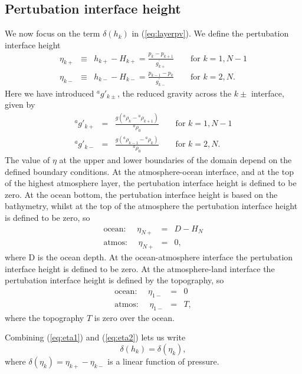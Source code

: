\documentclass[11pt, a4paper,twoside]{article}
\newcommand{\rhb}[1]{{{}^{#1}\rho}}
\newcommand{\gp}[2]{{}^{#1}g'_{#2}}
\numberwithin{equation}{section}
\begin{document}
\subsection{Pertubation interface height}
We now focus on the term $\delta(h_k)$ in (\ref{eq:layerpv}). We define the pertubation interface height
\begin{eqnarray}
\eta_{k+} & \equiv & h_{k+} - H_{k+} = \frac{p_k - p_{k+1}}{g^\prime_{k+}} \quad \quad \textrm{for } k=1,N-1\label{eq:eta1}\\
\eta_{k-} & \equiv & h_{k-} - H_{k-} = \frac{p_{k-1} - p_{k}}{g^\prime_{k-}}  \quad \quad \textrm{for } k=2,N.\label{eq:eta2}
\end{eqnarray}
Here we have introduced $\gp{a}{k\pm}$, the reduced gravity across the $k\pm$ interface, given by
\begin{eqnarray}
\gp{a}{k+} & = & \frac{g(\rhb{a}_k - \rhb{a}_{k+1})}{\rhb{a}_0} \quad \quad \textrm{for } k=1,N-1\\
\gp{a}{k-} & = & \frac{g(\rhb{a}_{k-1} - \rhb{a}_{k})}{\rhb{a}_0} \quad \quad \textrm{for } k=2,N.
\end{eqnarray}
The value of $\eta$ at the upper and lower boundaries of the domain depend on the defined boundary conditions.
At the atmosphere-ocean interface, and at the top of the highest atmosphere layer, the pertubation interface height is defined to be zero.
At the ocean bottom, the pertubation interface height is based on the bathymetry, whilst at the top of the atmosphere the pertubation interface height is defined to be zero, so
\begin{eqnarray}
\textrm{ocean: } \quad \eta_{N+} & = & D - H_N \\
\textrm{atmos: } \quad \eta_{N+} & = & 0,
\end{eqnarray}
where D is the ocean depth.
At the ocean-atmosphere interface the pertubation interface height is defined to be zero. At the atmosphere-land interface the pertubation interface height is defined by the topography, so
\begin{eqnarray}
\textrm{ocean: } \quad \eta_{1-} & = & 0 \\
\textrm{atmos: } \quad \eta_{1-} & = & T,
\end{eqnarray}
where the topography $T$ is zero over the ocean.

Combining (\ref{eq:eta1}) and (\ref{eq:eta2}) lets us write
\begin{equation}
\delta(h_k) = \delta(\eta_k),
\end{equation}
where $\delta(\eta_k) = \eta_{k+} - \eta_{k-}$ is a linear function of pressure.
\end{document}
